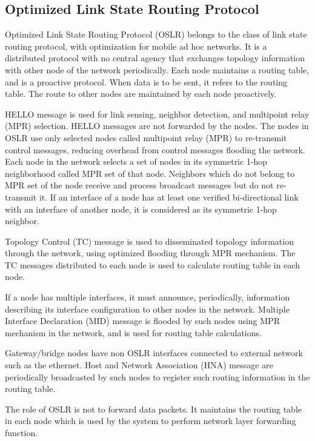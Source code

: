 \subsection{Optimized Link State Routing Protocol}

Optimized Link State Routing Protocol (OSLR) belongs to the class of link state routing protocol, with optimization for mobile ad hoc networks.  It is a distributed protocol with no central agency that exchanges topology information with other node of the network periodically. Each node maintains a routing table, and is a proactive protocol. When data is to be sent, it refers to the routing table. The route to other nodes are maintained by each node proactively. 

HELLO message is used for link sensing, neighbor detection, and multipoint relay (MPR) selection. HELLO messages are not forwarded by the nodes. The nodes in OSLR use only selected nodes called multipoint relay (MPR) to re-transmit control messages, reducing overhead from control messages flooding the network. Each node in the network selects a set of nodes in its symmetric 1-hop neighborhood called MPR set of that node. Neighbors which do not belong to MPR set of the node receive and process broadcast messages but do not re-transmit it. If an interface of a node has at least one verified bi-directional link with an interface of another node, it is considered as its symmetric 1-hop neighbor. 

Topology Control (TC) message is used to disseminated topology information through the network, using optimized flooding through MPR mechanism. The TC messages distributed to each node is used to calculate routing table in each node.

If a node has multiple interfaces, it must announce, periodically, information describing its interface configuration to other nodes in the network. Multiple Interface Declaration (MID) message is flooded by such nodes using MPR mechanism in the network, and is used for routing table calculations.

Gateway/bridge nodes have non OSLR interfaces connected to external network such as the ethernet. Host and Network Association (HNA) message are periodically broadcasted by such nodes to register such routing information in the routing table.


The role of OSLR is not to forward data packets. It maintains the routing table in each node which is used by the system to perform network layer forwarding function.

